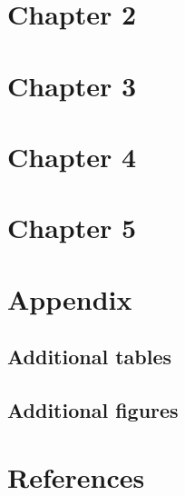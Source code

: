 \newpage


\section{Chapter 2}
\label{sec:Chapter2}


\newpage

\section{Chapter 3}
\label{sec:Chapter3}


\newpage

\section{Chapter 4}
\label{sec:Chapter4}


\newpage

\section{Chapter 5}
\label{sec:Chapter5}

\newpage

\section{Appendix}
\label{sec:Appen}

\newpage

\subsection{Additional tables}
\subsection{Additional figures}


\newpage

\section{References}
\label{sec:Refs}

\newpage







